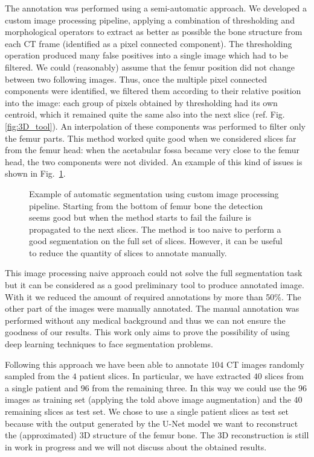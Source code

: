 \documentclass{standalone}
\begin{document}
The annotation was performed using a semi-automatic approach.
We developed a custom image processing pipeline, applying a combination of thresholding and morphological operators to extract as better as possible the bone structure from each CT frame (identified as a pixel connected component).
The thresholding operation produced many false positives into a single image which had to be filtered.
We could (reasonably) assume that the femur position did not change between two following images.
Thus, once the multiple pixel connected components were identified, we filtered them according to their relative position into the image: each group of pixels obtained by thresholding had its own centroid, which it remained quite the same also into the next slice (ref. Fig.\ref{fig:3D_tool}).
An interpolation of these components was performed to filter only the femur parts.
This method worked quite good when we considered slices far from the femur head: when the acetabular fossa became very close to the femur head, the two components were not divided.
An example of this kind of issues is shown in Fig.~\ref{fig:seg_tool}.

\begin{figure}[htbp]
\centering
\def\svgwidth{0.85\textwidth}

\caption{Example of automatic segmentation using custom image processing pipeline.
Starting from the bottom of femur bone the detection seems good but when the method starts to fail the failure is propagated to the next slices.
The method is too naive to perform a good segmentation on the full set of slices.
However, it can be useful to reduce the quantity of slices to annotate manually.
}
\label{fig:seg_tool}
\end{figure}

This image processing naive approach could not solve the full segmentation task but it can be considered as a good preliminary tool to produce annotated image.
With it we reduced the amount of required annotations by more than 50\%.
The other part of the images were manually annotated.
The manual annotation was performed without any medical background and thus we can not ensure the goodness of our results.
This work only aims to prove the possibility of using deep learning techniques to face segmentation problems.

Following this approach we have been able to annotate $104$ CT images randomly sampled from the $4$ patient slices.
In particular, we have extracted $40$ slices from a single patient and $96$ from the remaining three.
In this way we could use the $96$ images as training set (applying the told above image augmentation) and the $40$ remaining slices as test set.
We chose to use a single patient slices as test set because with the output generated by the U-Net model we want to reconstruct the (approximated) 3D structure of the femur bone.
The 3D reconstruction is still in work in progress and we will not discuss about the obtained results.
\end{document}
